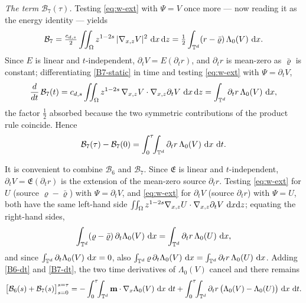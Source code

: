 \documentclass[12pt,a4paper,twoside]{article}
\newcommand{\vr}{\varrho}
\newcommand{\vc}[1]{{\bf #1}}
\newcommand{\dx}{{\,\rm d} {x}}
\newcommand{\dt}{{\,\rm d} t }
\numberwithin{equation}{section}%
\newcommand{\vm}{\vc{m}}
\newcommand{\dz}{{\rm d} z}
\newcommand{\Gradx}{\nabla_x}
\newcommand{\Gradxz}{\nabla_{x,z}}
\newcommand{\Lambdaz}{\Lambda_0}
\begin{document}
\begin{pf}
\smallskip
\noindent\emph{The term $\mathcal B_7(\tau)$.} Testing \eqref{eq:w-ext} with $\Psi=V$ once more
--- now reading it as the energy identity --- yields
\begin{equation}\label{B7-static}
	\mathcal B_7 = \tfrac{c_{d,s}}2\iint_\Omega z^{1-2s}\,|\Gradxz V|^2\,\dx\,\dz
	= \tfrac12\int_{\mathbb T^d}(r-\bar\vr)\,\Lambdaz(V)\,\dx .
\end{equation}
Since $E$ is linear and $t$-independent, $\partial_t V=E(\partial_t r)$, and $\partial_t r$ is
mean-zero as $\bar\vr$ is constant; differentiating \eqref{B7-static} in time and testing
\eqref{eq:w-ext} with $\Psi=\partial_t V$,
\begin{equation}\label{B7-symm}
	\frac{d}{dt}\,\mathcal B_7(t)
	= c_{d,s}\iint_\Omega z^{1-2s}\,\Gradxz V\cdot\Gradxz\partial_t V\,\dx\,\dz
	= \int_{\mathbb T^d}\partial_t r\,\Lambdaz(V)\,\dx ,
\end{equation}
the factor $\tfrac12$ absorbed because the two symmetric contributions of the product rule
coincide. Hence
\begin{equation}\label{B7-dt}
	\mathcal B_7(\tau)-\mathcal B_7(0)
	= \int_0^\tau\!\!\int_{\mathbb T^d}\partial_t r\,\Lambdaz(V)\,\dx\,\dt .
\end{equation}

It is convenient to combine $\mathcal B_6$ and $\mathcal B_7$. Since $\mathfrak{E}$ is linear and
$t$-independent, $\partial_t V=\mathfrak{E}(\partial_t r)$ is the extension of the mean-zero source
$\partial_t r$. Testing \eqref{eq:w-ext} for $U$ (source $\vr-\bar\vr$) with $\Psi=\partial_t V$,
and \eqref{eq:w-ext} for $\partial_t V$ (source $\partial_t r$) with $\Psi=U$, both have the same
left-hand side $\iint_\Omega z^{1-2s}\Gradxz U\cdot\Gradxz\partial_t V\,\dx\dz$; equating the
right-hand sides,
\[
\int_{\mathbb T^d}(\vr-\bar\vr)\,\partial_t\Lambdaz(V)\,\dx
= \int_{\mathbb T^d}\partial_t r\,\Lambdaz(U)\,\dx ,
\]
and since $\int_{\mathbb T^d}\partial_t\Lambdaz(V)\,\dx=0$, also
$\int_{\mathbb T^d}\vr\,\partial_t\Lambdaz(V)\,\dx=\int_{\mathbb T^d}\partial_t r\,\Lambdaz(U)\,\dx$.
Adding \eqref{B6-dt} and \eqref{B7-dt}, the two time derivatives of $\Lambdaz(V)$ cancel and there
remains
\begin{equation}\label{B67}
	\big[\mathcal B_6(s)+\mathcal B_7(s)\big]_{s=0}^{s=\tau}
	= -\int_0^\tau\!\!\int_{\mathbb T^d}\vm\cdot\Gradx\Lambdaz(V)\,\dx\,\dt
	+ \int_0^\tau\!\!\int_{\mathbb T^d}\partial_t r\,\big(\Lambdaz(V)-\Lambdaz(U)\big)\,\dx\,\dt .
\end{equation}



\end{pf}
\end{document}
